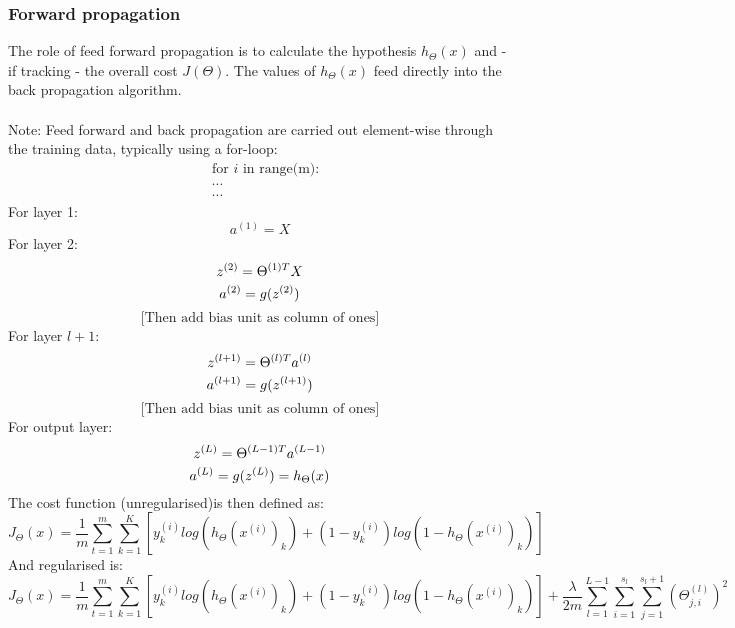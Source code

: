 \documentclass[12pt]{article}
\begin{document}
\subsubsection{Forward propagation}
The role of feed forward propagation is to calculate the hypothesis $h_{\Theta}(x)$ and - if tracking - the overall cost $J(\Theta)$. The values of $h_{\Theta}(x)$ feed directly into the back propagation algorithm.\\
\\
Note: Feed forward and back propagation are carried out element-wise through the training data, typically using a for-loop:
\begin{equation}
\begin{split}
& \textrm{for $i$ in range(m):}\\
& \cdots\\
& \cdots
\end{split}
\end{equation}
For layer 1:
\begin{equation}
a^{(1)}=X
\end{equation}
For layer 2:
\begin{equation*}
z^{(2)}=\Theta^{(1)T}X\\
\end{equation*}
\begin{equation*}
a^{(2)}=g(z^{(2)})\\
\end{equation*}
\begin{equation}
\textrm{[Then add bias unit as column of ones]}
\end{equation}
For layer $l+1$:
\begin{equation*}
z^{(l+1)}=\Theta^{(l)T}a^{(l)}\\
\end{equation*}
\begin{equation*}
a^{(l+1)}=g(z^{(l+1)})\\
\end{equation*}
\begin{equation}
\textrm{[Then add bias unit as column of ones]}
\end{equation}
For output layer:
\begin{equation*}
z^{(L)}=\Theta^{(L-1)T}a^{(L-1)}\\
\end{equation*}
\begin{equation}
a^{(L)}=g(z^{(L)})=h_{\Theta}(x)\\
\end{equation}
The cost function (unregularised)is then defined as:
\begin{equation}
J_{\Theta}(x)=\frac{1}{m}\sum_{t=1}^{m}\sum_{k=1}^{K}[y^{(i)}_{k}log(h_{\Theta}(x^{(i)})_{k})+(1-y^{(i)}_{k})log(1-h_{\Theta}(x^{(i)})_{k})]
\end{equation}
And regularised is:
\begin{equation}
J_{\Theta}(x)=\frac{1}{m}\sum_{t=1}^{m}\sum_{k=1}^{K}[y^{(i)}_{k}log(h_{\Theta}(x^{(i)})_{k})+(1-y^{(i)}_{k})log(1-h_{\Theta}(x^{(i)})_{k})]+\frac{\lambda}{2m}\sum_{l=1}^{L-1}\sum_{i=1}^{s_l}\sum_{j=1}^{s_{l}+1}(\Theta^{(l)}_{j,i})^{2}
\end{equation}
\end{document}
